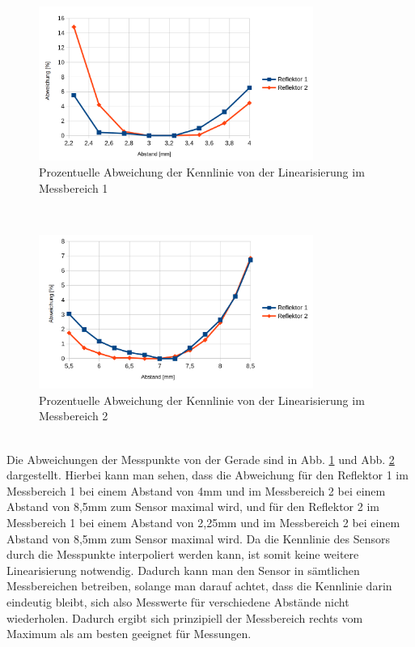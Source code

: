 \begin{figure}[h]
	\centering
	\includegraphics[width=0.8\textwidth]{./img/ch6/Prozentuelle_Abweichung_Kennlinie_Linearisierung_Messbereich_1}
	\caption{Prozentuelle Abweichung der Kennlinie von der Linearisierung im Messbereich 1}
	\label{fg:kenn_mb1}
\end{figure}
~\\
\begin{figure}[h]
	\centering
	\includegraphics[width=0.8\textwidth]{./img/ch6/Prozentuelle_Abweichung_Kennlinie_Linearisierung_Messbereich_2}
	\caption{Prozentuelle Abweichung der Kennlinie von der Linearisierung im Messbereich 2}
	\label{fg:kenn_mb2}
\end{figure}
~\\
Die Abweichungen der Messpunkte von der Gerade sind in Abb. \ref{fg:kenn_mb1} und Abb. \ref{fg:kenn_mb2} dargestellt. Hierbei kann man sehen, dass die Abweichung für den Reflektor 1 im Messbereich 1 bei einem Abstand von 4mm und im Messbereich 2 bei einem Abstand von 8,5mm zum Sensor maximal wird, und für den Reflektor 2 im Messbereich 1 bei einem Abstand von 2,25mm und im Messbereich 2 bei einem Abstand von 8,5mm zum Sensor maximal wird. Da die Kennlinie des Sensors durch die Messpunkte interpoliert werden kann, ist somit keine weitere Linearisierung notwendig. Dadurch kann man den Sensor in sämtlichen Messbereichen betreiben, solange man darauf achtet, dass die Kennlinie darin eindeutig bleibt, sich also Messwerte für verschiedene Abstände nicht wiederholen. Dadurch ergibt sich prinzipiell der Messbereich rechts vom Maximum als am besten geeignet für Messungen.


